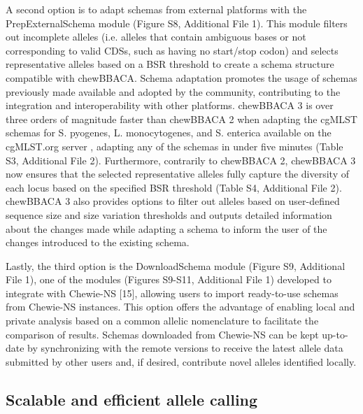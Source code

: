 A second option is to adapt schemas from external platforms with the PrepExternalSchema module (Figure S8, Additional File 1). This module filters out incomplete alleles (i.e. alleles that contain ambiguous bases or not corresponding to valid CDSs, such as having no start/stop codon) and selects representative alleles based on a BSR threshold to create a schema structure compatible with chewBBACA. Schema adaptation promotes the usage of schemas previously made available and adopted by the community, contributing to the integration and interoperability with other platforms. chewBBACA 3 is over three orders of magnitude faster than chewBBACA 2 when adapting the cgMLST schemas for S. pyogenes, L. monocytogenes, and S. enterica available on the cgMLST.org server \citep{noauthor_cgmlstorg_nodate}, adapting any of the schemas in under five minutes (Table S3, Additional File 2). Furthermore, contrarily to chewBBACA 2, chewBBACA 3 now ensures that the selected representative alleles fully capture the diversity of each locus based on the specified BSR threshold (Table S4, Additional File 2). chewBBACA 3 also provides options to filter out alleles based on user-defined sequence size and size variation thresholds and outputs detailed information about the changes made while adapting a schema to inform the user of the changes introduced to the existing schema.

Lastly, the third option is the DownloadSchema module (Figure S9, Additional File 1), one of the modules (Figures S9-S11, Additional File 1) developed to integrate with Chewie-NS \citep{mamede_chewie_2021} [15], allowing users to import ready-to-use schemas from Chewie-NS instances. This option offers the advantage of enabling local and private analysis based on a common allelic nomenclature to facilitate the comparison of results. Schemas downloaded from Chewie-NS can be kept up-to-date by synchronizing with the remote versions to receive the latest allele data submitted by other users and, if desired, contribute novel alleles identified locally.

\subsection{Scalable and efficient allele calling} \label{ssec:results_discussion_ssec2}

